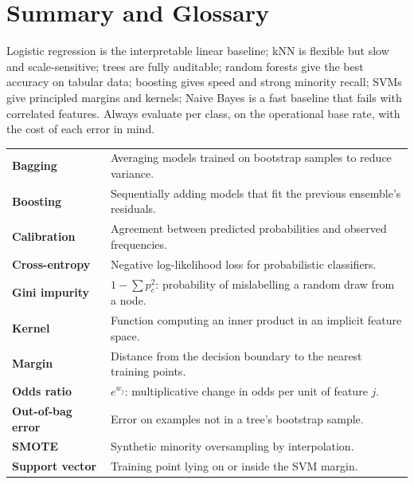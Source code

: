 \documentclass[11pt]{article}
\begin{document}
\section{Summary and Glossary}
Logistic regression is the interpretable linear baseline; kNN is flexible but slow and scale-sensitive; trees are fully auditable; random forests give the best accuracy on tabular data; boosting gives speed and strong minority recall; SVMs give principled margins and kernels; Naive Bayes is a fast baseline that fails with correlated features. Always evaluate per class, on the operational base rate, with the cost of each error in mind.
\begin{center}\small\renewcommand{\arraystretch}{1.2}
\begin{tabularx}{\textwidth}{>{\bfseries}p{3.3cm}X}\toprule
Bagging & Averaging models trained on bootstrap samples to reduce variance.\\
Boosting & Sequentially adding models that fit the previous ensemble's residuals.\\
Calibration & Agreement between predicted probabilities and observed frequencies.\\
Cross-entropy & Negative log-likelihood loss for probabilistic classifiers.\\
Gini impurity & $1-\sum p_c^2$: probability of mislabelling a random draw from a node.\\
Kernel & Function computing an inner product in an implicit feature space.\\
Margin & Distance from the decision boundary to the nearest training points.\\
Odds ratio & $e^{w_j}$: multiplicative change in odds per unit of feature $j$.\\
Out-of-bag error & Error on examples not in a tree's bootstrap sample.\\
SMOTE & Synthetic minority oversampling by interpolation.\\
Support vector & Training point lying on or inside the SVM margin.\\\bottomrule
\end{tabularx}\end{center}
\end{document}
